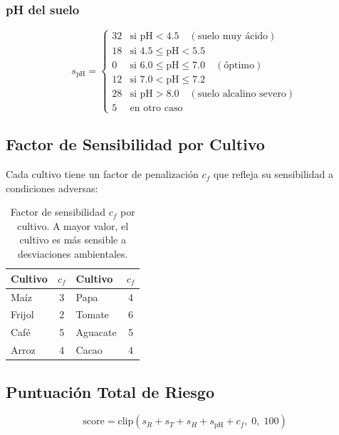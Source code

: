 \documentclass[12pt, a4paper]{article}
\begin{document}
\subsubsection*{pH del suelo}
\begin{equation}
  s_{\text{pH}} =
  \begin{cases}
    32 & \text{si pH} < 4.5 \quad (\text{suelo muy ácido}) \\
    18 & \text{si } 4.5 \leq \text{pH} < 5.5 \\
    0  & \text{si } 6.0 \leq \text{pH} \leq 7.0 \quad (\text{óptimo}) \\
    12 & \text{si } 7.0 < \text{pH} \leq 7.2 \\
    28 & \text{si pH} > 8.0 \quad (\text{suelo alcalino severo}) \\
    5  & \text{en otro caso}
  \end{cases}
  \label{eq:score_ph}
\end{equation}

\subsection{Factor de Sensibilidad por Cultivo}

Cada cultivo tiene un factor de penalización $c_f$ que refleja su sensibilidad a condiciones adversas:

\begin{table}[h!]
\centering
\begin{tabular}{lclc}
\toprule
\textbf{Cultivo} & $c_f$ & \textbf{Cultivo} & $c_f$ \\
\midrule
Maíz     & 3 & Papa    & 4 \\
Frijol   & 2 & Tomate  & 6 \\
Café     & 5 & Aguacate & 5 \\
Arroz    & 4 & Cacao   & 4 \\
\bottomrule
\end{tabular}
\caption{Factor de sensibilidad $c_f$ por cultivo. A mayor valor, el cultivo es más sensible a desviaciones ambientales.}
\end{table}

\subsection{Puntuación Total de Riesgo}

\begin{equation}
  \text{score} = \text{clip}\!\left(s_R + s_T + s_H + s_{\text{pH}} + c_f,\; 0,\; 100\right)
  \label{eq:score_total}
\end{equation}
\end{document}
